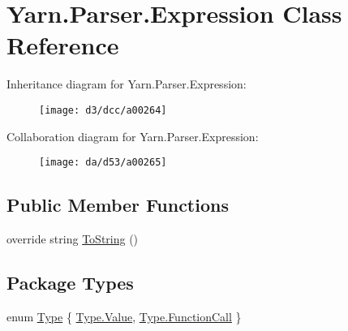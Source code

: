 \hypertarget{a00040}{\section{Yarn.\-Parser.\-Expression Class Reference}
\label{a00040}
}


Inheritance diagram for Yarn.\-Parser.\-Expression\-:
\nopagebreak
\begin{figure}[H]
\begin{center}
\leavevmode
\texttt{[image: d3/dcc/a00264]}
\end{center}
\end{figure}


Collaboration diagram for Yarn.\-Parser.\-Expression\-:
\nopagebreak
\begin{figure}[H]
\begin{center}
\leavevmode
\texttt{[image: da/d53/a00265]}
\end{center}
\end{figure}
\subsection*{Public Member Functions}
\begin{DoxyCompactItemize}
\item 
override string \hyperlink{a00063_a18c67cb16090d0889bb9d6c8c6c565f8}{To\-String} ()
\end{DoxyCompactItemize}
\subsection*{Package Types}
\begin{DoxyCompactItemize}
\item 
enum \hyperlink{a00040_aceddb5496ccffe668bced2d131e4bf86}{Type} \{ \hyperlink{a00040_aceddb5496ccffe668bced2d131e4bf86a689202409e48743b914713f96d93947c}{Type.\-Value}, 
\hyperlink{a00040_aceddb5496ccffe668bced2d131e4bf86affb017548928ab2305e7c55cb67c04ca}{Type.\-Function\-Call}
 \}
\end{DoxyCompactItemize}
